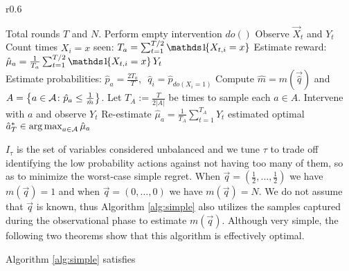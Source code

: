 \begin{wrapfigure}[18]{r}{0.6\textwidth}
\vspace{-18pt}
\begin{minipage}{.6\textwidth}
\begin{algorithm}[H]
\caption{Parallel Bandit Algorithm}\label{alg:simple}
\begin{algorithmic}[1]
 Total rounds $T$ and $N$.
\STATE Perform empty intervention $do()$
\STATE Observe $\vec{X}_t$ and $Y_t$
\ENDFOR
{}
\STATE Count times $X_i = x$ seen: $T_a = \sum_{t=1}^{T/2} \ind{X_{t,i} = x}$
\STATE Estimate reward: $\hat{\mu}_a = \frac{1}{T_a} \sum_{t=1}^{T/2} \ind{X_{t,i} = x} Y_t$ \\[0.2cm]
\STATE Estimate probabilities: $\hat{p}_a = \frac{2 T_a}{T}$,\,\, $\hat q_i = \hat p_{do(X_i = 1)}$
\ENDFOR
\STATE Compute $\hat{m} = m(\vec{\hat q})$ and $A = \left\{a \in \mathcal{A} \colon \hat{p}_a \leq \frac{1}{\hat m}\right\}$.
\STATE Let $T_A := \frac{T}{2 |A|}$ be times to sample each $a\in A$.
\STATE Intervene with $a$ and observe $Y_t$
\ENDFOR
\STATE Re-estimate $\hat{\mu}_a = \frac{1}{T_A} \sum_{t=1}^{T_A} Y_t$
\ENDFOR
\RETURN estimated optimal $\hat{a}^*_T \in \argmax_{a\in\actions} \hat{\mu}_a$
\end{algorithmic}
\end{algorithm}
\end{minipage}
\end{wrapfigure}

$I_\tau$ is the set of variables considered unbalanced and we tune $\tau$ to trade off identifying the low probability actions against not having too many of them, so as to minimize the worst-case simple regret. When $\vec{q} = (\frac{1}{2}, \ldots, \frac{1}{2})$ we have $m(\vec{q}) = 1$ and when $\vec{q} = (0, \ldots, 0)$ we have $m(\vec{q}) = N$. We do not assume that $\vec{q}$ is known, thus Algorithm \ref{alg:simple} also utilizes the samples captured during the observational phase to estimate $m(\vec{q})$. Although very simple, the following two theorems show that this algorithm is effectively optimal.



\begin{theorem}\label{thm:uq-simple}
Algorithm \ref{alg:simple} satisfies
\end{theorem}


